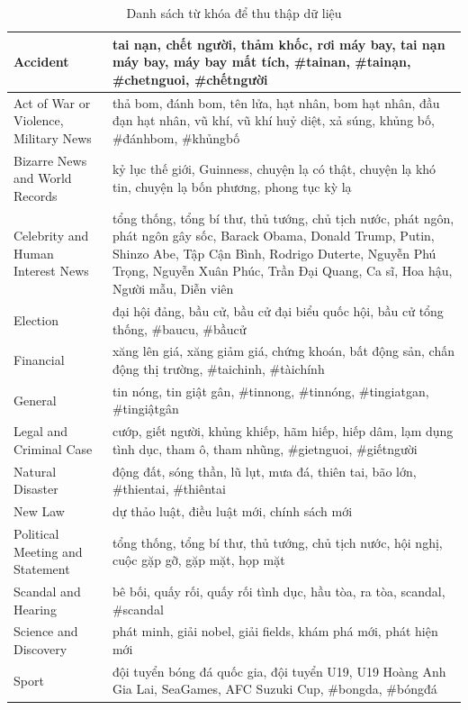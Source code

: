 	\begin{table}[H]
		\setlength\extrarowheight{3pt}
		\begin{tabular}{|p{4cm}|p{10cm}|}
			\hline
			Accident      & tai nạn, chết người, thảm khốc, rơi máy bay, tai nạn máy bay, máy bay mất tích, \#tainan, \#tainạn, \#chetnguoi, \#chếtngười \\
			\hline
			Act of War or Violence, Military News & thả bom, đánh bom, tên lửa, hạt nhân, bom hạt nhân, đầu đạn hạt nhân, vũ khí, vũ khí huỷ diệt, xả súng, khủng bố, \#đánhbom, \#khủngbố \\
			\hline
			Bizarre News and World Records & kỷ lục thế giới, Guinness, chuyện lạ có thật, chuyện lạ khó tin, chuyện lạ bốn phương, phong tục kỳ lạ \\
			\hline
			Celebrity and Human Interest News & tổng thống, tổng bí thư, thủ tướng, chủ tịch nước, phát ngôn, phát ngôn gây sốc, Barack Obama, Donald Trump, Putin, Shinzo Abe, Tập Cận Bình, Rodrigo Duterte, Nguyễn Phú Trọng, Nguyễn Xuân Phúc, Trần Đại Quang, Ca sĩ, Hoa hậu, Người mẫu,	Diễn viên \\
			\hline
			Election      & đại hội đảng, bầu cử, bầu cử đại biểu quốc hội, bầu cử tổng thống, \#baucu, \#bầucử \\
			\hline
			Financial     & xăng lên giá, xăng giảm giá, chứng khoán, bất động sản, chấn động thị trường, \#taichinh, \#tàichính \\
			\hline
			General       & tin nóng, tin giật gân, \#tinnong, \#tinnóng, \#tingiatgan, \#tingiậtgân \\
			\hline
			Legal and Criminal Case & cướp, giết người, khủng khiếp, hãm hiếp, hiếp dâm, lạm dụng tình dục, tham ô, tham nhũng, \#gietnguoi, \#giếtngười \\
			\hline
			Natural Disaster & động đất, sóng thần, lũ lụt, mưa đá, thiên tai, bão lớn, \#thientai, \#thiêntai \\
			\hline
			New Law       & dự thảo luật, điều luật mới, chính sách mới \\
			\hline
			Political Meeting and Statement & tổng thống, tổng bí thư, thủ tướng, chủ tịch nước, hội nghị, cuộc gặp gỡ, gặp mặt, họp mặt \\
			\hline
			Scandal and Hearing & bê bối, quấy rối, quấy rối tình dục, hầu tòa, ra tòa, scandal, \#scandal \\
			\hline
			Science and Discovery & phát minh, giải nobel, giải fields, khám phá mới, phát hiện mới \\
			\hline
			Sport         & đội tuyển bóng đá quốc gia, đội tuyển U19, U19 Hoàng Anh Gia Lai, SeaGames, AFC Suzuki Cup, \#bongda, \#bóngđá \\
			\hline
		\end{tabular}%
		\caption{Danh sách từ khóa để thu thập dữ liệu}
		\label{tab:twitterkeywords}%
	\end{table}%

